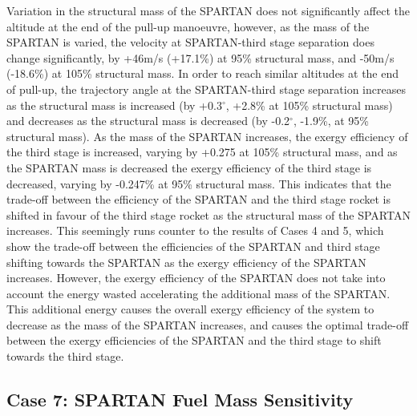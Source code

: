 Variation in the structural mass of the SPARTAN does not significantly affect the altitude at the end of the pull-up manoeuvre, however, as the mass of the SPARTAN is varied, the velocity at SPARTAN-third stage separation does change significantly, by +46m/s (+17.1\%) at 95\% structural mass, and -50m/s (-18.6\%) at 105\% structural mass. In order to reach similar altitudes at the end of pull-up, the trajectory angle at the SPARTAN-third stage separation increases as the structural mass is increased (by +0.3$^\circ$, +2.8\% at 105\% structural mass) and decreases as the structural mass is decreased (by -0.2$^\circ$, -1.9\%, at 95\% structural mass). 
As the mass of the SPARTAN increases, the exergy efficiency of the third stage is increased, varying by +0.275 at 105\% structural mass, and as the SPARTAN mass is decreased the exergy efficiency of the third stage is decreased, varying by -0.247\% at 95\% structural mass. 
This indicates that the trade-off between the efficiency of the SPARTAN and the third stage rocket is shifted in favour of the third stage rocket as the structural mass of the SPARTAN increases. 
This seemingly runs counter to the results of Cases 4 and 5, which show the trade-off between the efficiencies of the SPARTAN and third stage shifting towards the SPARTAN as the exergy efficiency of the SPARTAN increases. 
However, the exergy efficiency of the SPARTAN does not take into account the energy wasted accelerating the additional mass of the SPARTAN. This additional energy causes the overall exergy efficiency of the system to decrease as the mass of the SPARTAN increases, and causes the optimal trade-off between the exergy efficiencies of the SPARTAN and the third stage to shift towards the third stage. 

\subsection{Case 7: SPARTAN Fuel Mass Sensitivity} \label{sec:fuelmassNoReturn}

